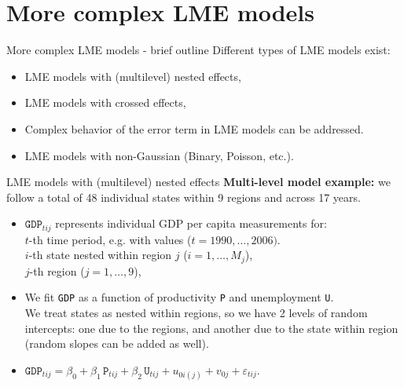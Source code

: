 \documentclass{beamer}
\begin{document}
\section{More complex LME models}
\begin{frame}{More complex LME models - brief outline}
Different types of LME models exist:\\
\bigskip
\begin{itemize}
\item LME models with (multilevel) nested effects,
\medskip
\item LME models with crossed effects,
\medskip
\item Complex behavior of the error term in LME models can be addressed.
\medskip
\item LME models with non-Gaussian (Binary, Poisson, etc.).
\end{itemize}
\end{frame}
\begin{frame}{LME models with (multilevel) nested effects}
\textbf{Multi-level model example:} we follow a total of 48 individual states within 9 regions and across 17 years.
\medskip
\begin{itemize}
\item $\texttt{GDP}_{tij}$ represents individual GDP per capita measurements for:\\
\smallskip
$t$-th time period, e.g. with values ($t= 1990, \dots, 2006)$.\\
$i$-th state nested within region $j$ ($i=1,\dots,M_j$),\\
$j$-th region ($j=1,\dots,9$),\\



\medskip
\item We fit \texttt{GDP} as a function of productivity \texttt{P} and unemployment \texttt{U}.\\
\smallskip
We treat states as nested within regions, so we have 2 levels of random intercepts: one due to the regions, and another due to the state within region (random slopes can be added as well).
\bigskip
\item $\texttt{GDP}_{tij} = \beta_0 + \beta_1 \, \texttt{P}_{tij} 
+ \beta_2 \, \texttt{U}_{tij} + u_{0i(j)} + v_{0j}  + \varepsilon_{tij}.$
\end{itemize}
\end{frame}
\end{document}
